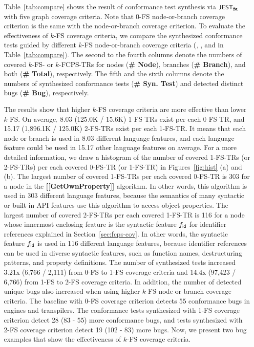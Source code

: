 
Table~\ref{tab:compare} shows the result of conformance test synthesis via
$\textsf{\small JEST}_{\textsf{\small fs}}$ with five graph coverage criteria.
%
Note that 0-FS node-or-branch coverage criterion is the same with the node-or-branch
coverage criterion.
%
To evaluate the effectiveness of $k$-FS coverage criteria, we compare the synthesized
conformance tests guided by different $k$-FS node-or-branch coverage criteria
(, , and  in Table~\ref{tab:compare}).
%
The second to the fourth columns denote the numbers of covered $k$-FS- or $k$-FCPS-TRs for
nodes (\textbf{\small \# Node}), branches (\textbf{\small \# Branch}), and both
(\textbf{\small \# Total}), respectively.
%
The fifth and the sixth columns denote the numbers of synthesized conformance tests
(\textbf{\small\# Syn. Test}) and detected distinct bugs
(\textbf{\small\# Bug}), respectively.


The results show that higher $k$-FS coverage criteria are more
effective than lower $k$-FS.
On average, 8.03 (125.0K / 15.6K) 1-FS-TRs exist per each 0-FS-TR, and 15.17 (1,896.1K
/ 125.0K) 2-FS-TRs exist per each 1-FS-TR.
%
It means that each node or branch is used in 8.03 different language features,
and each language feature could be used in 15.17 other language features on average.
%
For a more detailed information, we draw a histogram of the number of covered
1-FS-TRs (or 2-FS-TRs) per each covered 0-FS-TR (or 1-FS-TR) in
Figures~\ref{fig:hist} (a) and (b).
%
The largest number of covered 1-FS-TRs per each covered 0-FS-TR is 303
for a node in the \textbf{[[GetOwnProperty]]} algorithm.
%
In other words, this algorithm is used in 303 different language features,
because the semantics of many syntactic or built-in API features use
this algorithm to access object properties.
%
The largest number of covered 2-FS-TRs per each covered 1-FS-TR is 116
for a node whose innermost enclosing feature is the syntactic feature $f_{\textsf{id}}$
for identifier references explained in Section~\ref{sec:fcps-cov}.
%
In other words, the syntactic feature $f_{\textsf{id}}$ is used in 116 different
language features, because identifier references can be used in
diverse syntactic features, such as function names, destructuring
patterns, and property definitions.
%
The number of synthesized tests increased 3.21x (6,766 / 2,111) from 0-FS to
1-FS coverage criteria and 14.4x (97,423 / 6,766) from 1-FS to 2-FS coverage
criteria.
%
In addition, the number of detected unique bugs also increased when using higher
$k$-FS node-or-branch coverage criteria.
%
The baseline with 0-FS coverage criterion detects 55 conformance bugs in engines
and transpilers.
%
The conformance tests synthesized with 1-FS coverage criterion detect 28
(83 - 55) more conformance bugs, and tests synthesized with 2-FS coverage
criterion detect 19 (102 - 83) more bugs.
%
Now, we present two bug examples that show the effectiveness of $k$-FS coverage
criteria.


